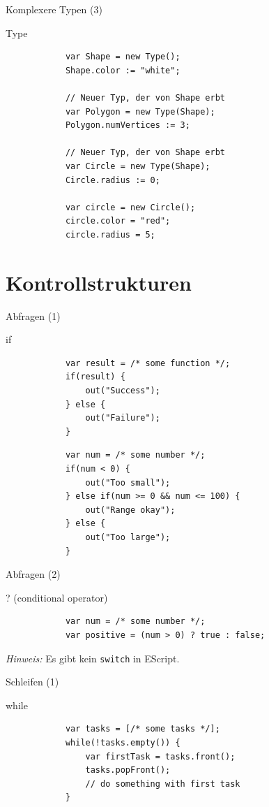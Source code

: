 \documentclass[ucs,9pt]{beamer}
\begin{document}
\begin{frame}[fragile]{Komplexere Typen (3)}
	\begin{block}{Type}
		\begin{lstlisting}
			var Shape = new Type();
			Shape.color := "white";

			// Neuer Typ, der von Shape erbt
			var Polygon = new Type(Shape); 
			Polygon.numVertices := 3;

			// Neuer Typ, der von Shape erbt
			var Circle = new Type(Shape); 
			Circle.radius := 0;

			var circle = new Circle();
			circle.color = "red";
			circle.radius = 5;
		\end{lstlisting}
	\end{block}
\end{frame}
 
\section{Kontrollstrukturen}
\begin{frame}[fragile]{Abfragen (1)}
	\begin{block}{if}
		\begin{lstlisting}
			var result = /* some function */;
			if(result) {
			    out("Success");
			} else {
			    out("Failure");
			}
		\end{lstlisting}
		\begin{lstlisting}
			var num = /* some number */;
			if(num < 0) {
			    out("Too small");
			} else if(num >= 0 && num <= 100) {
			    out("Range okay");
			} else {
			    out("Too large");
			}
		\end{lstlisting}
	\end{block}
\end{frame}

\begin{frame}[fragile]{Abfragen (2)}
	\begin{block}{? (conditional operator)}
		\begin{lstlisting}
			var num = /* some number */;
			var positive = (num > 0) ? true : false;
		\end{lstlisting}
	\end{block}
	\pause
	\vfill
	\emph{Hinweis:} Es gibt kein \lstinline!switch! in EScript.
\end{frame}

\begin{frame}[fragile]{Schleifen (1)}
	\begin{block}{while}
		\begin{lstlisting}
			var tasks = [/* some tasks */];
			while(!tasks.empty()) {
			    var firstTask = tasks.front();
			    tasks.popFront();
			    // do something with first task
			}
		\end{lstlisting}
	\end{block}
\end{frame}
\end{document}
